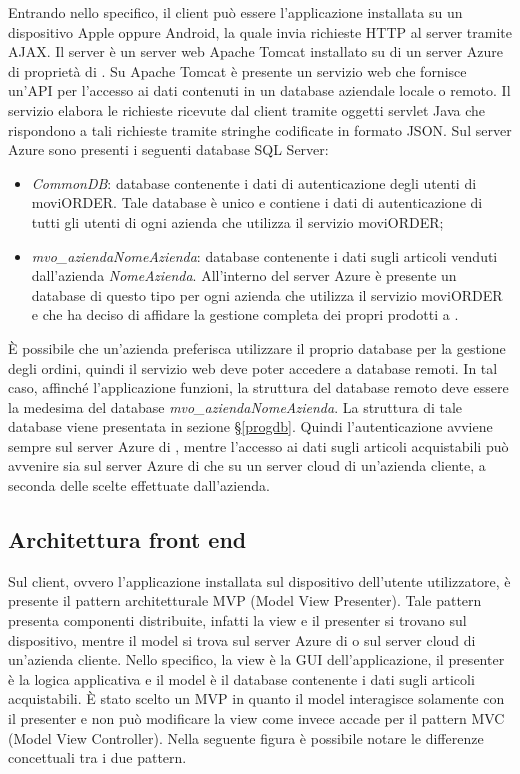 Entrando nello specifico, il client può essere l'applicazione installata su un dispositivo Apple oppure Android, la quale invia richieste HTTP al server tramite AJAX. Il server è un server web Apache Tomcat installato su di un server Azure di proprietà di \visione{}. Su Apache Tomcat è presente un servizio web che fornisce un'API per l'accesso ai dati contenuti in un database aziendale locale o remoto. Il servizio elabora le richieste ricevute dal client tramite oggetti servlet Java che rispondono a tali richieste tramite stringhe codificate in formato JSON. Sul server Azure sono presenti i seguenti database SQL Server:
\begin{itemize}
	\item \textit{CommonDB}: database contenente i dati di autenticazione degli utenti di moviORDER. Tale database è unico e contiene i dati di autenticazione di tutti gli utenti di ogni azienda che utilizza il servizio moviORDER;
	\item \textit{mvo\_aziendaNomeAzienda}: database contenente i dati sugli articoli venduti dall'azienda \textit{NomeAzienda}. All'interno del server Azure è presente un database di questo tipo per ogni azienda che utilizza il servizio moviORDER e che ha deciso di affidare la gestione completa dei propri prodotti a \visione{}.
\end{itemize}
È possibile che un'azienda preferisca utilizzare il proprio database per la gestione degli ordini, quindi il servizio web deve poter accedere a database remoti. In tal caso, affinché l'applicazione funzioni, la struttura del database remoto deve essere la medesima del database \textit{mvo\_aziendaNomeAzienda}. La struttura di tale database viene presentata in sezione §\ref{progdb}.
Quindi l'autenticazione avviene sempre sul server Azure di \visione{}, mentre l'accesso ai dati sugli articoli acquistabili può avvenire sia sul server Azure di \visione{} che su un server cloud di un'azienda cliente, a seconda delle scelte effettuate dall'azienda.

\subsection{Architettura front end}

Sul client, ovvero l'applicazione installata sul dispositivo dell'utente utilizzatore, è presente il pattern architetturale MVP (Model View Presenter). Tale pattern presenta componenti distribuite, infatti la view e il presenter si trovano sul dispositivo, mentre il model si trova sul server Azure di \visione{} o sul server cloud di un'azienda cliente. Nello specifico, la view è la GUI dell'applicazione, il presenter è la logica applicativa e il model è il database contenente i dati sugli articoli acquistabili. È stato scelto un MVP in quanto il model interagisce solamente con il presenter e non può modificare la view come invece accade per il pattern MVC (Model View Controller). Nella seguente figura è possibile notare le differenze concettuali tra i due pattern.

